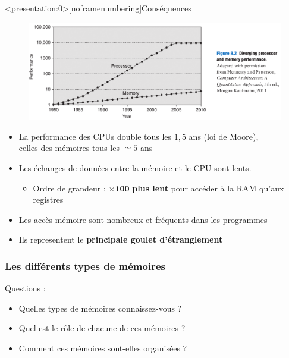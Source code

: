 \documentclass[8pt]{beamer}
\begin{document}
\begin{frame}<presentation:0>[noframenumbering]{Cons\'equences}
    \begin{figure}[ht]
        \centering
        \centering
        \includegraphics[width=.75\linewidth]{figures/gap_cpu_ram_H.png}
        \label{fig:sub2}
    \end{figure}
    \begin{itemize}
        \item La performance des CPUs double tous les $1,5$ ans (loi de Moore),
              \\ celles des mémoires tous les $\simeq5$ ans
        \item Les \'echanges de données entre la mémoire et le CPU sont
              lents.
              \begin{itemize}
                  \item Ordre de grandeur : $\boldsymbol{\times}\textbf{100}$
                        \textbf{plus
                            lent}
                        pour
                        accéder
                        à la RAM qu'aux registres
              \end{itemize}
        \item Les acc\`es mémoire sont nombreux et fréquents dans les
              programmes
        \item Ils representent le \textbf{principale goulet d'\'etranglement}
    \end{itemize}
\end{frame}

\begin{frame}
    \frametitle{Les différents types de mémoires}
    \begin{alertblock}{Questions :}
        \begin{itemize}
            \item Quelles types de m\'emoires connaissez-vous ?
            \item Quel est le r\^ole de chacune de ces m\'emoires ?
            \item Comment ces m\'emoires sont-elles organis\'ees ?
        \end{itemize}
    \end{alertblock}
\end{frame}
\end{document}
